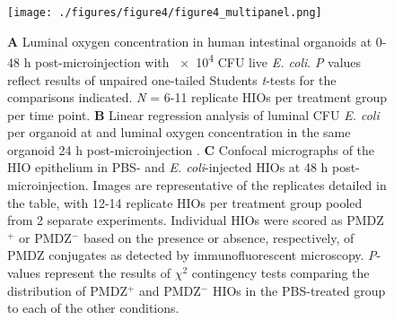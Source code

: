 \documentclass[9pt,lineo]{elife}
\begin{document}
\begin{figure}
\begin{fullwidth}
\centering
\texttt{[image: ./figures/figure4/figure4\_multipanel.png]}
\caption{\textbf{A} Luminal oxygen concentration in human intestinal organoids at 0-48 h post-microinjection with \num{e4} CFU live \textit{E. coli}. \textit{P} values reflect results of unpaired one-tailed Students \textit{t}-tests for the comparisons indicated. \textit{N} = 6-11 replicate HIOs per treatment group per time point. \textbf{B} Linear regression analysis of luminal CFU \textit{E. coli} per organoid at and luminal oxygen concentration in the same organoid 24 h post-microinjection . \textbf{C} Confocal micrographs of the HIO epithelium in PBS- and \textit{E. coli}-injected HIOs at 48 h post-microinjection. Images are representative of the replicates detailed in the table, with 12-14 replicate HIOs per treatment group pooled from 2 separate experiments. Individual HIOs were scored as PMDZ$^{+}$ or PMDZ$^{-}$ based on the presence or absence, respectively, of PMDZ conjugates as detected by immunofluorescent microscopy. \textit{P}-values represent the results of $\chi{}^{2}$ contingency tests comparing the distribution of PMDZ$^{+}$ and PMDZ$^{-}$ HIOs in the PBS-treated group to each of the other conditions.}
\label{fig:fullwidth}
\end{fullwidth}
\end{figure}
\end{document}
